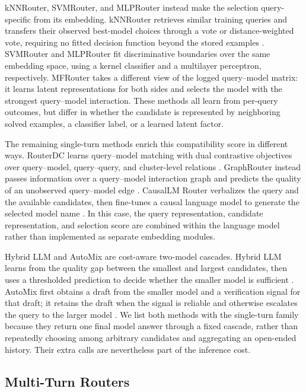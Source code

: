 kNNRouter, SVMRouter, and MLPRouter instead make the selection query-specific from its embedding. kNNRouter retrieves similar training queries and transfers their observed best-model choices through a vote or distance-weighted vote, requiring no fitted decision function beyond the stored examples \citep{li2025rethinking,shnitzer2023large}. SVMRouter and MLPRouter fit discriminative boundaries over the same embedding space, using a kernel classifier and a multilayer perceptron, respectively. MFRouter takes a different view of the logged query--model matrix: it learns latent representations for both sides and selects the model with the strongest query--model interaction. These methods all learn from per-query outcomes, but differ in whether the candidate is represented by neighboring solved examples, a classifier label, or a learned latent factor.

The remaining single-turn methods enrich this compatibility score in different ways. RouterDC learns query--model matching with dual contrastive objectives over query--model, query--query, and cluster-level relations \citep{chen2024routerdc}. GraphRouter instead passes information over a query--model interaction graph and predicts the quality of an unobserved query--model edge \citep{feng2024graphrouter}. CausalLM Router verbalizes the query and the available candidates, then fine-tunes a causal language model to generate the selected model name \citep{ong2024routellm}. In this case, the query representation, candidate representation, and selection score are combined within the language model rather than implemented as separate embedding modules.

Hybrid LLM and AutoMix are cost-aware two-model cascades. Hybrid LLM learns from the quality gap between the smallest and largest candidates, then uses a thresholded prediction to decide whether the smaller model is sufficient \citep{ding2024hybrid}. AutoMix first obtains a draft from the smaller model and a verification signal for that draft; it retains the draft when the signal is reliable and otherwise escalates the query to the larger model \citep{aggarwal2024automix}. We list both methods with the single-turn family because they return one final model answer through a fixed cascade, rather than repeatedly choosing among arbitrary candidates and aggregating an open-ended history. Their extra calls are nevertheless part of the inference cost.

\subsection{Multi-Turn Routers}

